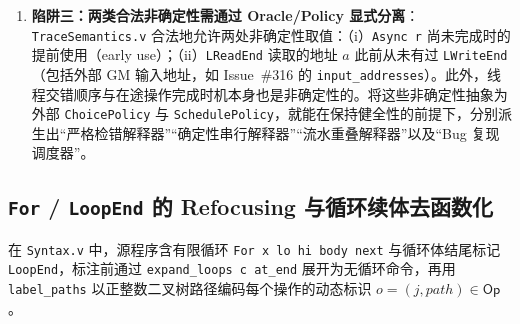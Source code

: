 \documentclass[UTF8,a4paper,11pt,fontset=fandol]{ctexart}
\newcommand{\code}[1]{\texttt{#1}}
\newcommand{\Ops}{\mathsf{Op}}
\begin{document}
\begin{enumerate}
\item \textbf{陷阱三：两类合法非确定性需通过 Oracle/Policy 显式分离}：
  \code{TraceSemantics.v} 合法地允许两处非确定性取值：（i）\code{Async r} 尚未完成时的提前使用（early use）；（ii）\code{LReadEnd} 读取的地址 $a$ 此前从未有过 \code{LWriteEnd}（包括外部 GM 输入地址，如 Issue~\#316 的 \code{input\_addresses}）。此外，线程交错顺序与在途操作完成时机本身也是非确定性的。将这些非确定性抽象为外部 \code{ChoicePolicy} 与 \code{SchedulePolicy}，就能在保持健全性的前提下，分别派生出“严格检错解释器”“确定性串行解释器”“流水重叠解释器”以及“Bug 复现调度器”。
\end{enumerate}

\subsection{\texorpdfstring{\code{For} / \code{LoopEnd}}{For / LoopEnd} 的 Refocusing 与循环续体去函数化}
\label{sec:refocusing}

在 \code{Syntax.v} 中，源程序含有限循环 \code{For x lo hi body next} 与循环体结尾标记 \code{LoopEnd}，标注前通过 \code{expand\_loops c at\_end} 展开为无循环命令，再用 \code{label\_paths} 以正整数二叉树路径编码每个操作的动态标识 $o = (j, \mathit{path}) \in \Ops$。
\end{document}
